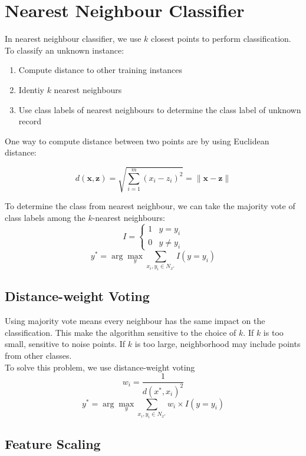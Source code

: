 \chapter{Nearest Neighbour Classifier}

\begin{multicols}{2}

\noindent In nearest neighbour classifier, we use $k$ closest points to perform classification. To classify an unknown instance:

\begin{enumerate}
    \item Compute distance to other training instances
    \item Identiy $k$ nearest neighbours
    \item Use class labels of nearest neighbours to determine the class label of unknown record
\end{enumerate}

\noindent One way to compute distance between two points are by using Euclidean distance:

$$d(\mathbf{x},\mathbf{z}) = \sqrt{\sum_{i=1}^m (x_i - z_i)^2} = \|\mathbf{x} - \mathbf{z}\|$$

\noindent To determine the class from nearest neighbour, we can take the majority vote of class labels among the $k$-nearest neighbours:
$$
I = 
\begin{cases}
1 & y = y_i\\
0 & y \ne y_i
\end{cases}
$$
$$y^* = \arg\!\max_y \sum_{x_i,y_i \in N_{x^*}} I(y = y_i)$$

\section{Distance-weight Voting}

\noindent Using majority vote means every neighbour has the same impact on the classification. This make the algorithm sensitive to the choice of $k$. If $k$ is too small, sensitive to noise points. If $k$ is too large, neighborhood may include points from other classes. \\

\noindent To solve this problem, we use distance-weight voting
$$w_i=\frac{1}{d(x^*,x_i)^2}$$
$$y^* = \arg\!\max_y \sum_{x_i,y_i \in N_{x^*}} w_i \times I(y = y_i)$$


\section{Feature Scaling}


\end{multicols}
